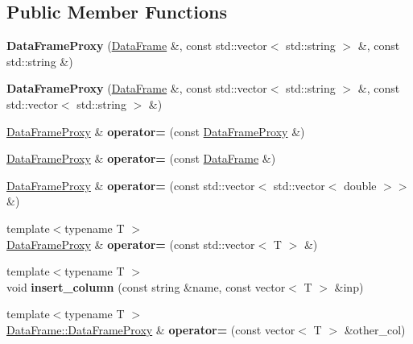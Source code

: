 \subsection*{Public Member Functions}
\begin{DoxyCompactItemize}
\item 
\mbox{\label{classDataFrame_1_1DataFrameProxy_a8146ed01a9c802591fe8aa1cca40da92}} 
{\bfseries Data\+Frame\+Proxy} (\hyperlink{classDataFrame}{Data\+Frame} \&, const std\+::vector$<$ std\+::string $>$ \&, const std\+::string \&)
\item 
\mbox{\label{classDataFrame_1_1DataFrameProxy_aea502f05eaf39709839140db0ae104f1}} 
{\bfseries Data\+Frame\+Proxy} (\hyperlink{classDataFrame}{Data\+Frame} \&, const std\+::vector$<$ std\+::string $>$ \&, const std\+::vector$<$ std\+::string $>$ \&)
\item 
\mbox{\label{classDataFrame_1_1DataFrameProxy_a6d56fc9161384065db7812e513313731}} 
\hyperlink{classDataFrame_1_1DataFrameProxy}{Data\+Frame\+Proxy} \& {\bfseries operator=} (const \hyperlink{classDataFrame_1_1DataFrameProxy}{Data\+Frame\+Proxy} \&)
\item 
\mbox{\label{classDataFrame_1_1DataFrameProxy_a680def6fdcc7d488e10b2dba471f8854}} 
\hyperlink{classDataFrame_1_1DataFrameProxy}{Data\+Frame\+Proxy} \& {\bfseries operator=} (const \hyperlink{classDataFrame}{Data\+Frame} \&)
\item 
\mbox{\label{classDataFrame_1_1DataFrameProxy_ae6c8c653d011966f9bf91396123bb0a5}} 
\hyperlink{classDataFrame_1_1DataFrameProxy}{Data\+Frame\+Proxy} \& {\bfseries operator=} (const std\+::vector$<$ std\+::vector$<$ double $>$$>$ \&)
\item 
\mbox{\label{classDataFrame_1_1DataFrameProxy_a25774e44f4e4d36e5b640e7387d24361}} 
{\footnotesize template$<$typename T $>$ }\\\hyperlink{classDataFrame_1_1DataFrameProxy}{Data\+Frame\+Proxy} \& {\bfseries operator=} (const std\+::vector$<$ T $>$ \&)
\item 
\mbox{\label{classDataFrame_1_1DataFrameProxy_a74080fd3f0407cefdb332062ca91ecc9}} 
{\footnotesize template$<$typename T $>$ }\\void {\bfseries insert\+\_\+column} (const string \&name, const vector$<$ T $>$ \&inp)
\item 
\mbox{\label{classDataFrame_1_1DataFrameProxy_a6910b480e16f67a6ae3f5d36757c0a57}} 
{\footnotesize template$<$typename T $>$ }\\\hyperlink{classDataFrame_1_1DataFrameProxy}{Data\+Frame\+::\+Data\+Frame\+Proxy} \& {\bfseries operator=} (const vector$<$ T $>$ \&other\+\_\+col)
\end{DoxyCompactItemize}
